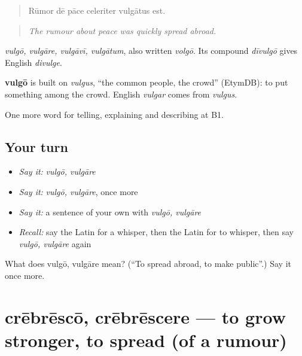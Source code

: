 \begin{quote}
Rūmor dē pāce celeriter vulgātus est.
\end{quote}

\begin{quote}
\emph{The rumour about peace was quickly spread abroad.}
\end{quote}

\emph{vulgō, vulgāre, vulgāvī, vulgātum}, also written \emph{volgō}. Its compound \emph{dīvulgō} gives English \emph{divulge}.

\begin{cousinweb}
\textbf{vulgō} is built on \emph{vulgus}, \textquotedblleft{}the common people, the crowd\textquotedblright{} (EtymDB): to put something among the crowd. English \emph{vulgar} comes from \emph{vulgus}.
\end{cousinweb}

\begin{grammarlens}[title={What you've built}]
One more word for telling, explaining and describing at B1.
\end{grammarlens}

\subsection*{Your turn}
\begin{itemize}
\raggedright
  \item \emph{Say it:} \emph{vulgō, vulgāre}
  \item \emph{Say it:} \emph{vulgō, vulgāre}, once more
  \item \emph{Say it:} a sentence of your own with \emph{vulgō, vulgāre}
  \item \emph{Recall:} say the Latin for a whisper, then the Latin for to whisper, then say \emph{vulgō, vulgāre} again
\end{itemize}

\begin{tcolorbox}[breakable,colback=teal!4,colframe=teal!35!black,title={Before you move on}]
What does vulgō, vulgāre mean? (\textquotedblleft{}To spread abroad, to make public\textquotedblright{}.) Say it once more.
\end{tcolorbox}
\section[crēbrēscō, crēbrēscere]{crēbrēscō, crēbrēscere — to grow stronger, to spread (of a rumour)}

\label{lesson:LA-C301-crebresco}




